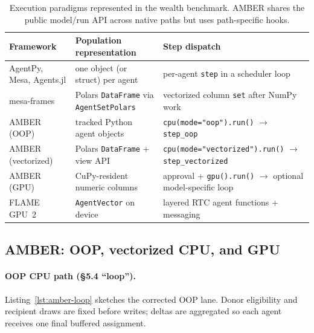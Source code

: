 \documentclass[sigconf,nonacm,review,natbib=true]{acmart}
\newcommand{\appendixbreak}{%
  \FloatBarrier
}
\theoremstyle{definition}
\theoremstyle{plain}
\theoremstyle{remark}
\begin{document}
\begin{table}[H]
\centering\small
\caption{Execution paradigms represented in the wealth benchmark. AMBER shares
the public model/run API across native paths but uses path-specific hooks.}
\label{tab:usage_paradigm}
\begin{tabularx}{\textwidth}{@{} l X X @{}}
\toprule
Framework & Population representation & Step dispatch \\
\midrule
AgentPy, Mesa, Agents.jl & one object (or struct) per agent & per-agent \texttt{step} in a scheduler loop \\
mesa-frames \citep{mesaframes} & Polars \texttt{DataFrame} via \texttt{AgentSetPolars} & vectorized column \texttt{set} after NumPy work \\
AMBER (OOP) & tracked Python agent objects & \texttt{cpu(mode="oop").run()} $\rightarrow$ \texttt{step\_oop} \\
AMBER (vectorized) & Polars \texttt{DataFrame} + view API & \texttt{cpu(mode="vectorized").run()} $\rightarrow$ \texttt{step\_vectorized} \\
AMBER (GPU) & CuPy-resident numeric columns & approval + \texttt{gpu().run()} $\rightarrow$ optional model-specific loop \\
FLAME GPU~2 \citep{richmond2023} & \texttt{AgentVector} on device & layered RTC agent functions + messaging \\
\bottomrule
\end{tabularx}
\end{table}

\appendixbreak
\subsection{AMBER: OOP, vectorized CPU, and GPU}
\label{app:usage:amber}

\paragraph{OOP CPU path (\S5.4 ``loop'').}
Listing~\ref{lst:amber-loop} sketches the corrected OOP lane. Donor eligibility
and recipient draws are fixed before writes; deltas are aggregated so each
agent receives one final buffered assignment.
\end{document}

